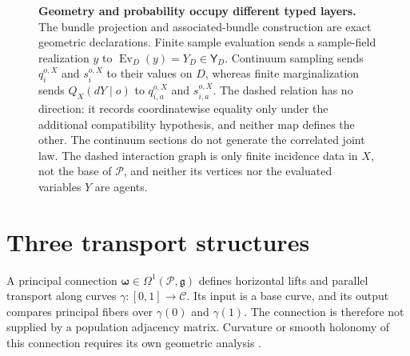 \begin{figure}[tbp]
\centering

\caption{\textbf{Geometry and probability occupy different typed layers.} The bundle projection and associated-bundle construction are exact geometric declarations. Finite sample evaluation sends a sample-field realization \(y\) to \(\operatorname{Ev}_D(y)=Y_D\in\mathsf Y_D\). Continuum sampling sends \(q_i^{o,X}\) and \(s_i^{o,X}\) to their values on \(D\), whereas finite marginalization sends \(Q_X(dY\mid o)\) to \(q_{i,a}^{o,X}\) and \(s_{i,a}^{o,X}\). The dashed relation has no direction: it records coordinatewise equality only under the additional compatibility hypothesis, and neither map defines the other. The continuum sections do not generate the correlated joint law. The dashed interaction graph is only finite incidence data in \(X\), not the base of \(\mathcal P\), and neither its vertices nor the evaluated variables \(Y\) are agents.}
\label{fig:magent-geometry-type-stack}
\end{figure}

\section{Three transport structures}

A principal connection \(\boldsymbol\omega\in\Omega^1(\mathcal P,\mathfrak g)\) defines horizontal lifts and parallel transport along curves \(\gamma:[0,1]\to\mathcal C\). Its input is a base curve, and its output compares principal fibers over \(\gamma(0)\) and \(\gamma(1)\). The connection is therefore not supplied by a population adjacency matrix. Curvature or smooth holonomy of this connection requires its own geometric analysis \citep{Kobayashi1963,Nakahara2003}.


